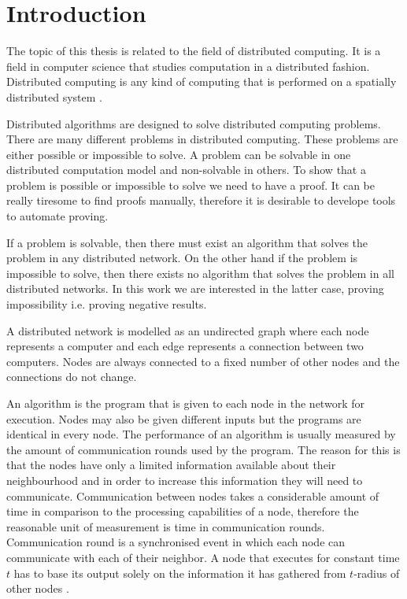 \section{Introduction}
The topic of this thesis is related to the field of distributed computing.
It is a field in computer science that studies computation in a distributed fashion.
Distributed computing is any kind of computing that is performed on a spatially distributed system
\cite{DBLP:books/el/leeuwen90/LamportL90}.

Distributed algorithms are designed to solve distributed computing problems.
There are many different problems in distributed computing.
These problems are either possible or impossible to solve.
A problem can be solvable in one distributed computation model and non-solvable in others.
To show that a problem is possible or impossible to solve we need to have a proof.
It can be really tiresome to find proofs manually, therefore it is desirable to develope tools to automate proving.

If a problem is solvable, then there must exist an algorithm that solves the problem in any distributed network.
On the other hand if the problem is impossible to solve, then there exists no algorithm that solves the problem in all distributed networks.
In this work we are interested in the latter case, proving impossibility i.e. proving negative results.

A distributed network is modelled as an undirected graph where each node represents a computer and each edge represents a connection between two computers.
Nodes are always connected to a fixed number of other nodes and the connections do not change.
\cite{DBLP:journals/siamcomp/NaorS95}

An algorithm is the program that is given to each node in the network for execution.
Nodes may also be given different inputs but the programs are identical in every node.
The performance of an algorithm is usually measured by the amount of communication rounds used by the program.
The reason for this is that the nodes have only a limited information available about their neighbourhood and in order to increase this information they will need to communicate.
Communication between nodes takes a considerable amount of time in comparison to the processing capabilities of a node, therefore the reasonable unit of measurement is time in communication rounds. %
Communication round is a synchronised event in which each node can communicate with each of their neighbor.
A node that executes for constant time $t$ has to base its output solely on the information it has gathered from $t$-radius of other nodes
\cite{DBLP:journals/siamcomp/NaorS95}.

